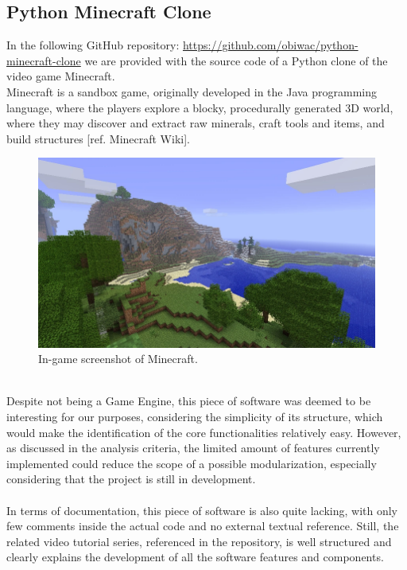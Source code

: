 \subsection{Python Minecraft Clone}
In the following GitHub repository: \href{https://github.com/obiwac/python-minecraft-clone}{https://github.com/obiwac/python-minecraft-clone} we are provided with the source code of a Python clone of the video game Minecraft. \\
Minecraft is a sandbox game, originally developed in the Java programming language, where the players explore a blocky, procedurally generated 3D world, where they may discover and extract raw minerals, craft tools and items, and build structures [ref. Minecraft Wiki]. 
\begin{figure}[h!]
	\centering
	\includegraphics[width=0.8\linewidth]{"immagini/Feasibility study/Minecraft"}
	\caption[In-game screenshot of Minecraft.]{In-game screenshot of Minecraft.}
	\label{fig:minecraft}
\end{figure}
\\
Despite not being a Game Engine, this piece of software was deemed to be interesting for our purposes, considering the simplicity of its structure, which would make the identification of the core functionalities relatively easy. However, as discussed in the analysis criteria, the limited amount of features currently implemented could reduce the scope of a possible modularization, especially considering that the project is still in development. \\ \\
In terms of documentation, this piece of software is also quite lacking, with only few comments inside the actual code and no external textual reference. Still, the related video tutorial series, referenced in the repository, is well structured and clearly explains the development of all the software features and components.


